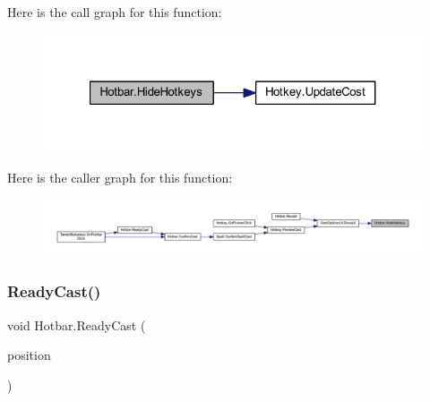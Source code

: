 Here is the call graph for this function\+:\nopagebreak
\begin{figure}[H]
\begin{center}
\leavevmode
\includegraphics[width=321pt]{class_hotbar_a2f8af9863292223ae00d361121164160_cgraph}
\end{center}
\end{figure}
Here is the caller graph for this function\+:\nopagebreak
\begin{figure}[H]
\begin{center}
\leavevmode
\includegraphics[width=350pt]{class_hotbar_a2f8af9863292223ae00d361121164160_icgraph}
\end{center}
\end{figure}
\mbox{\label{class_hotbar_a5ac379c585126b8e0e35c061b3388ecf}} 
\subsubsection{\texorpdfstring{ReadyCast()}{ReadyCast()}}
{\footnotesize\ttfamily void Hotbar.\+Ready\+Cast (\begin{DoxyParamCaption}\item[{Vector2\+Int}]{position }\end{DoxyParamCaption})}

